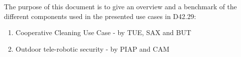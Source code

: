 The purpose of this document is to give an overview and a benchmark of the different components used in the presented use cases in D42.29:
\begin{enumerate}
	\item Cooperative Cleaning Use Case - by \ac{TUE}, \ac{SAX} and \ac{BUT}
	\item Outdoor tele-robotic security - by \ac{PIAP} and \ac{CAM}
\end{enumerate}
